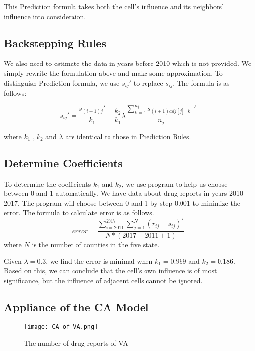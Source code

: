 \documentclass{mcmthesis}
\begin{document}
    This Prediction formula takes both the cell's influence and its neighbors' influence into consideraion.
\subsection{Backstepping Rules}
    We also need to estimate the data in years before 2010 which is not provided. We simply rewrite the formulation above and make some approximation. To distinguish Prediction formula, we use $s_{ij}'$ to replace $s_{ij}$. The formula is as follows:

       \begin{equation} s_{ij}' = \frac{s_{(i+1)j}'}{k_1} - \frac{k_2}{k_1} \lambda \frac{\sum\limits_{k=1} ^{n_j} s_{(i+1) adj[j][k]}' }{n_j} \end{equation}
      
      where $k_1$ , $k_2$ and $\lambda$ are identical to those in Prediction Rules. 

\subsection{Determine Coefficients} \label{Section:Determine coefficients}
    To determine the coefficients $k_1$ and $k_2$, we use program to help us choose between $0$ and $1$ automatically. We have data about drug reports in years 2010-2017. The program will choose between $0$ and $1$ by step $0.001$  to minimize the error. The formula to calculate error is as follows.
    \begin{equation} error = \frac{\sum\limits_{i=2011}^{2017} \sum_{j=1}^{N} (r_{ij} - s_{ij})^2  }{N * (2017-2011+1)} \end{equation}
    where $N$ is the number of counties in the five state. \par
    Given $\lambda=0.3$, we find the error is minimal when $k_1=0.999$ and $k_2=0.186$. Based on this, we can conclude that the cell's own influence is of most significance, but the influence of adjacent cells cannot be ignored.

\subsection{Appliance of the CA Model}

\begin{figure}[!h]
\small
\centering
\texttt{[image: CA\_of\_VA.png]}
\caption{The number of drug reports of VA} \label{fig:CA_of_VA}
\end{figure}
\end{document}
